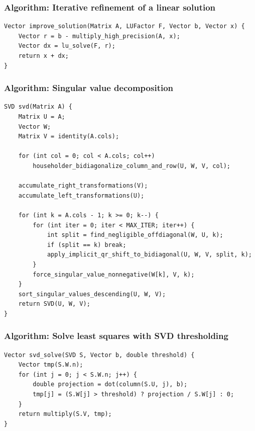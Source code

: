 \documentclass[11pt]{article}
\begin{document}
\subsubsection{Algorithm: Iterative refinement of a linear solution}\label{algorithm-iterative-refinement-of-a-linear-solution}

\begin{verbatim}
Vector improve_solution(Matrix A, LUFactor F, Vector b, Vector x) {
    Vector r = b - multiply_high_precision(A, x);
    Vector dx = lu_solve(F, r);
    return x + dx;
}
\end{verbatim}

\subsubsection{Algorithm: Singular value decomposition}\label{algorithm-singular-value-decomposition}

\begin{verbatim}
SVD svd(Matrix A) {
    Matrix U = A;
    Vector W;
    Matrix V = identity(A.cols);

    for (int col = 0; col < A.cols; col++)
        householder_bidiagonalize_column_and_row(U, W, V, col);

    accumulate_right_transformations(V);
    accumulate_left_transformations(U);

    for (int k = A.cols - 1; k >= 0; k--) {
        for (int iter = 0; iter < MAX_ITER; iter++) {
            int split = find_negligible_offdiagonal(W, U, k);
            if (split == k) break;
            apply_implicit_qr_shift_to_bidiagonal(U, W, V, split, k);
        }
        force_singular_value_nonnegative(W[k], V, k);
    }
    sort_singular_values_descending(U, W, V);
    return SVD(U, W, V);
}
\end{verbatim}

\subsubsection{Algorithm: Solve least squares with SVD thresholding}\label{algorithm-solve-least-squares-with-svd-thresholding}

\begin{verbatim}
Vector svd_solve(SVD S, Vector b, double threshold) {
    Vector tmp(S.W.n);
    for (int j = 0; j < S.W.n; j++) {
        double projection = dot(column(S.U, j), b);
        tmp[j] = (S.W[j] > threshold) ? projection / S.W[j] : 0;
    }
    return multiply(S.V, tmp);
}
\end{verbatim}
\end{document}
